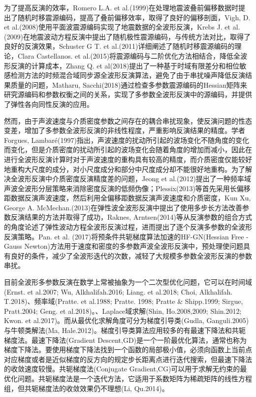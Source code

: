 \documentclass[12pt]{article}
\newcommand{\upcite}[1]{\textsuperscript{\textsuperscript{\cite{#1}}}}
\begin{document}
为了提高反演的效率，Romero L.A. et al.(1999)在处理地震波叠前偏移数据时提出了随机时移震源编码，提高了叠前偏移效率，取得了良好的偏移剖面\upcite{Romero1999}，Vigh, D. et al.(2008)使用平面波震源编码实现了地震数据的全波形反演\upcite{Vigh2008}，Krebs J. et al.(2009)在地震波动方程反演中提出了随机极性震源编码，与传统方法对比，取得了良好的反演效果\upcite{Krebs2009}，Schuster G T. et al.(2011)详细阐述了随机时移震源编码的理论\upcite{Schuster2011}，Clara Castellanos. et al.(2015)将震源编码与二阶优化方法相结合，降低全波形反演的计算成本\upcite{Castellanos2014}，Zhang Q. et al(2018)提出了一种基于时域有限差分和相位敏感检测方法的时频混合域同步源全波形反演算法，避免了由于串扰噪声降低反演结果质量的问题\upcite{ZhangQ2018}，Matharu, Sacchi(2018)通过检查多参数震源编码的Hessian矩阵来研究源编码和参数权衡之间的关系，实现了多参数全波形反演中的源编码，并提供了弹性各向同性反演的应用\upcite{Matharu2018}。
\par
然而，由于声波速度与介质密度参数之间存在的耦合串扰现象，使反演问题的性态变差，增加了多参数全波形反演的非线性程度，严重影响反演结果的精度。学者Forgues, Lambaré(1997)指出，声波速度的扰动所引起的波场变化不随角度的变化而变化，但是介质密度的扰动所引起的波场变化会随着角度的增加而减小，因此在进行全波形反演计算时对于声波速度的重构具有较高的精度，而介质密度仅能较好地重构大尺度的成分，对小尺度成分和部分中尺度成分却不能很好地重构\upcite{Forgues1997}。为了解决全波形反演中介质密度反演精度差的问题，Jeong et al.(2012)提出了一种频率域声波全波形分层策略来消除密度反演的低频伪像\upcite{Jeong2012}；Plessix(2013)等首先采用长偏移距数据反演声波速度，然后利用全偏移距数据反演声波速度和介质密度\upcite{Plessix2013}，Kun Xu, George A. McMechan.(2013)在弹性波全波形反演中提出了使用多步长方法改善参数反演结果的方法并取得了成功\upcite{XuK2013}，Raknes, Arntsen(2014)等从反演参数的组合方式的角度论述了弹性波动方程全波形反演过程，进而提出了逐个反演多参数的全波形反演策略\upcite{Raknes2014}。Pan. et al. (2017)将预条件共轭梯度算法加速的HF-GN(Hessian Free - Gauss Newton)方法用于速度和密度的多参数声波全波形反演中，预处理使问题具有良好的条件，减少了全波形迭代的次数，减轻了大规模多参数全波形反演的参数串扰\upcite{Pan2017}。
\par
目前全波形多参数反演在数学上常被抽象为一个二次型优化问题，它可以在时间域(Ernst. et al.2007; Wu, Alkhalifah.2016; Liang. et al.2018; Choi, Alkhalifah. T.2018)、频率域(Pratte. et al.1988; Pratte. 1998; Pratte \& Shipp.1999; Sirgue, Pratt.2004; Geng. et al.2018)\upcite{Ernst2007,Alkhalifah2006,Zhanyuan2018,Choi2018,Pratt1988,Pratt1998,Pratt1999,
PrattShipp1999,Sirgue2004,Geng2018}。、Laplace域求解(Shin, Ho.2008,2009; Shin.2012; Kwon. et al.2017)\upcite{Shin2008,Shin2009,Shin2012,Kwon2017}。而从最优化求解角度可分为梯度引导类(Gudla, Ganguli.2005)与牛顿类解法(Ma, Hale.2012)\upcite{Gudla2005,MaHale2012}。梯度引导类算法应用较多的有最速下降法和共轭梯度法。最速下降法(Gradient Descent,GD)是一个一阶最优化算法，通常也称为梯度下降法。要使用梯度下降法找到一个函数的局部极小值，必须向函数上当前点对应梯度或者是近似梯度的反方向的规定步长距离点进行迭代搜索，但最速下降法的收敛速度较慢。共轭梯度法(Conjugate Gradient,CG)可以用于求解无约束的最优化问题。共轭梯度法是一个迭代方法，它适用于系数矩阵为稀疏矩阵的线性方程组，但共轭梯度法的收敛效果仍不理想(Li, Qu.2014)\upcite{LiMQuA2014}。
\end{document}
